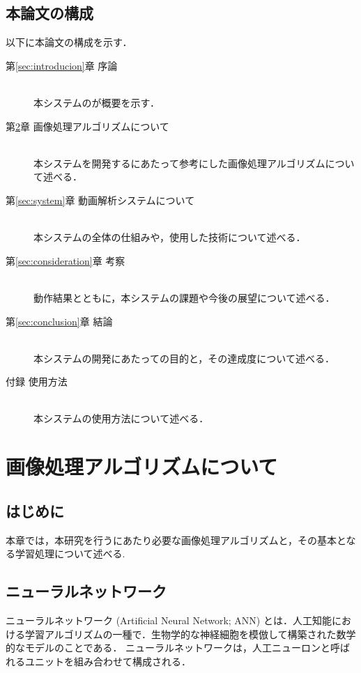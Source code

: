 \documentclass[a4j,12pt,dvipdfmx]{jreport}
\begin{document}
\section{本論文の構成}
以下に本論文の構成を示す．
\begin{description}
\item[第\ref{sec:introducion}章 \qquad 序論]\mbox{}\\
本システムのが概要を示す．

\item[第\ref{sec:algorithm}章 \qquad 画像処理アルゴリズムについて]\mbox{}\\
本システムを開発するにあたって参考にした画像処理アルゴリズムについて述べる．

\item[第\ref{sec:system}章 \qquad 動画解析システムについて]\mbox{}\\
本システムの全体の仕組みや，使用した技術について述べる．

\item[第\ref{sec:consideration}章 \qquad 考察]\mbox{}\\
動作結果とともに，本システムの課題や今後の展望について述べる．

\item[第\ref{sec:conclusion}章 \qquad 結論]\mbox{}\\
本システムの開発にあたっての目的と，その達成度について述べる．

\item[付録 \qquad 使用方法]\mbox{}\\
本システムの使用方法について述べる．
\end{description}

\clearpage

\chapter{画像処理アルゴリズムについて}
\label{sec:algorithm}

\section{はじめに}
本章では，本研究を行うにあたり必要な画像処理アルゴリズムと，その基本となる学習処理について述べる.

\section{ニューラルネットワーク}
ニューラルネットワーク (Artificial Neural Network; ANN) とは．人工知能における学習アルゴリズムの一種で．生物学的な神経細胞を模倣して構築された数学的なモデルのことである．
ニューラルネットワークは，人工ニューロンと呼ばれるユニットを組み合わせて構成される．
\end{document}
